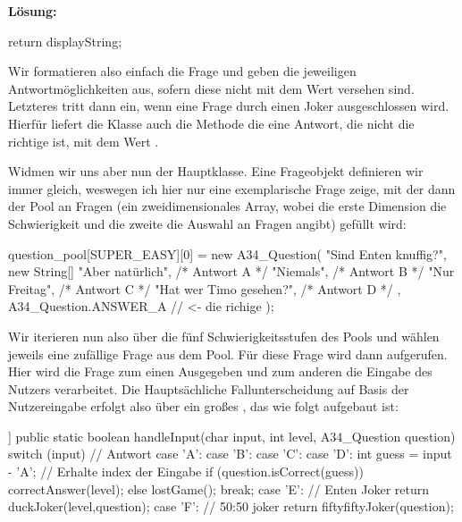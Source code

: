 \documentclass[table]{sopra-base}
\makeatletter
\newenvironment{solution}{\null\par\noindent\textbf{\textcolor{sob@col@uulm@cs}{Lösung:}}\newline\bgroup\color{black}\slshape\ignorespaces}{\egroup}
\makeatother
\begin{document}
\begin{solution}
\begin{java}[firstnumber=96]
{    return displayString;
}
\end{java}
    Wir formatieren also einfach die Frage und geben die jeweiligen Antwortmöglichkeiten aus, sofern diese nicht mit dem Wert  versehen sind. Letzteres tritt dann ein, wenn eine Frage durch einen Joker ausgeschlossen wird. Hierfür liefert die Klasse auch die Methode  die eine Antwort, die nicht die richtige ist, mit dem Wert .\par{}
    Widmen wir uns aber nun der Hauptklasse. Eine Frageobjekt definieren wir immer gleich, weswegen ich
    hier nur eine exemplarische Frage zeige, mit der dann der Pool an Fragen (ein zweidimensionales Array, wobei die erste Dimension die Schwierigkeit und die zweite die Auswahl an Fragen angibt) gefüllt wird:
\begin{java*}[morekeywords={[4]{SUPER\_EASY,ANSWER\_A}},add to literate={A34_Question}{{\solGet{keywordC}{A34\_Question}}}{11}]
question_pool[SUPER_EASY][0] = new A34_Question(
    "Sind Enten knuffig?",
    new String[] {
        "Aber natürlich",        /* Antwort A */
        "Niemals",               /* Antwort B */
        "Nur Freitag",           /* Antwort C */
        "Hat wer Timo gesehen?", /* Antwort D */
    }, A34_Question.ANSWER_A // <- die richige
);
\end{java*}
    Wir iterieren nun also über die fünf Schwierigkeitsstufen des Pools und wählen jeweils eine
    zufällige Frage aus dem Pool. Für diese Frage wird dann  aufgerufen. Hier wird die Frage zum einen Ausgegeben und zum anderen die Eingabe des Nutzers verarbeitet. Die Hauptsächliche Fallunterscheidung auf Basis der Nutzereingabe erfolgt also über ein großes , das wie folgt aufgebaut ist:
\begin{java}[firstnumber=106,add to literate={A34_Question}{{\solGet{keywordC}{A34\_Question}}}{11}]]
public static boolean handleInput(char input, int level,
                                  A34_Question question) {
    switch (input) {
        // Antwort
        case 'A': case 'B':
        case 'C': case 'D':
            int guess = input - 'A'; // Erhalte index der Eingabe
            if (question.isCorrect(guess)) {
                correctAnswer(level);
            } else {
                lostGame();
            }
            break;
        case 'E': // Enten Joker
            return duckJoker(level,question);
        case 'F': // 50:50 joker
            return fiftyfiftyJoker(question);
}}
\end{java}
\end{solution}
\end{document}

